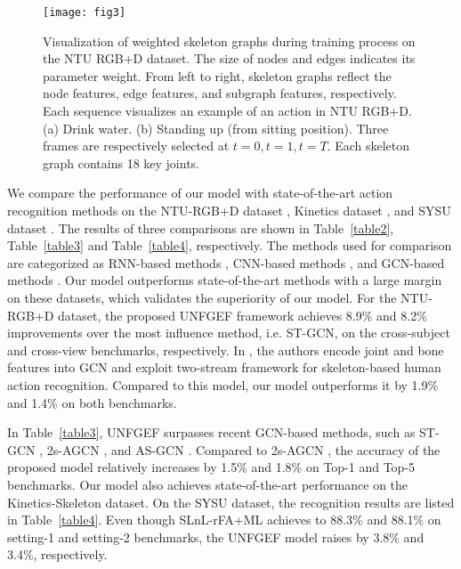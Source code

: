 \documentclass[journal]{IEEEtran}
\begin{document}
\begin{figure*}
\centering
\texttt{[image: fig3]}
\caption{Visualization of weighted skeleton graphs during training process on the NTU RGB+D dataset. The size of nodes and edges indicates its parameter weight. From left to right, skeleton graphs reflect the node features, edge features, and subgraph features, respectively. Each sequence visualizes an example of an action in NTU RGB+D. (a) Drink water. (b) Standing up (from sitting position). Three frames are respectively selected at $t=0,t=1,t=T$. Each skeleton graph contains 18 key joints.}
\label{fig5}
\end{figure*}
We compare the performance of our model with state-of-the-art action recognition methods on the
NTU-RGB+D dataset \cite{Shahroudy_2016_NTURGBD,liu2017two,liu2016spatio,song2017end,zhang2017view,li2018skeleton,li2018independently,kim2017interpretable,ke2017new,liu2017enhanced,yan2018spatial,du2015skeleton,li2017skeleton,tang2018deep,shi2019two} , Kinetics dataset \cite{fernando2015modeling,Shahroudy_2016_NTURGBD,kim2017interpretable,yan2018spatial,Li_2019_CVPR,shi2019two}
, and SYSU dataset \cite{zhang2019view,zhang2018adding,zhang2020semantics,hu2019joint}. The results of three comparisons are shown in Table~\ref{table2}, Table~\ref{table3} and Table~\ref{table4}, respectively. The methods used for comparison are categorized as RNN-based methods \cite{Shahroudy_2016_NTURGBD, liu2016spatio,song2017end,zhang2017view,li2018skeleton,fernando2015modeling,zhang2019view,zhang2018adding}, CNN-based methods \cite{liu2017two,li2018independently,kim2017interpretable,ke2017new,liu2017enhanced,du2015skeleton,li2017skeleton,tang2018deep}, and GCN-based methods \cite{yan2018spatial,shi2019two,Li_2019_CVPR,zhang2020semantics,hu2019joint}. Our model outperforms state-of-the-art methods with a large margin on these datasets, which validates the superiority of our model. For the NTU-RGB+D dataset, the proposed UNFGEF framework achieves 8.9\% and 8.2\% improvements over the most influence method, i.e. ST-GCN, on the cross-subject and cross-view benchmarks, respectively. In \cite{shi2019two}, the authors encode joint and bone features into GCN and exploit two-stream framework for skeleton-based human action recognition. Compared to this model, our model outperforms it by 1.9\% and 1.4\% on both benchmarks.

In Table~\ref{table3}, UNFGEF surpasses recent GCN-based methods, such as ST-GCN \cite{yan2018spatial}, 2s-AGCN \cite{shi2019two}, and AS-GCN \cite{Li_2019_CVPR}. Compared to 2s-AGCN \cite{shi2019two}, the accuracy of the proposed model relatively increases by 1.5\% and 1.8\% on Top-1 and Top-5 benchmarks. Our model also achieves state-of-the-art performance on the Kinetics-Skeleton dataset. On the SYSU dataset, the recognition results are listed in Table~\ref{table4}. Even though SLnL-rFA+ML \cite{hu2019joint} achieves to 88.3\% and 88.1\% on setting-1 and setting-2 benchmarks, the UNFGEF model raises by 3.8\% and 3.4\%, respectively.
\end{document}
